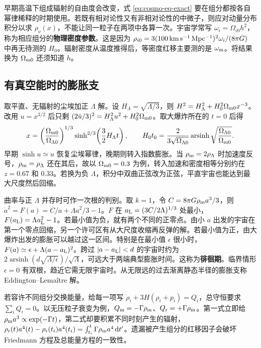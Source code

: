 早期高温下组成辐射的自由度会改变，式 \eqref{eq:cosmo-eq-exact} 要在组分都按各自幂律稀释的时期使用。若既有相对论性又有非相对论性的中微子，则应对动量分布积分以求 $\rho_\nu(x)$，不能让同一粒子在两项中各算一次。宇宙学常写 $\omega_i=\Omega_{i0}h^2$，称为相应组分的\textbf{物理密度参数}。这是因为 $\rho_{i0}=3(100\,{\rm km\,s^{-1}\,Mpc^{-1}})^2\omega_i/(8\pi G)$ 中再无待测的 $H_0$。辐射密度从温度推得后，等密度红移主要测的是 $\omega_{\rm m}$。将结果换为 $\Omega_{\rm m0}$ 还须知道 $h$。

\subsection{有真空能时的膨胀支}

取平直、无辐射的尘埃加正 $\Lambda$ 解。设 $H_\Lambda=\sqrt{\Lambda/3}$，则 $H^2=H_\Lambda^2+H_0^2\Omega_{\rm m0}x^{-3}$。改用 $u=x^{3/2}$ 后只剩 $(2\dot u/3)^2=H_\Lambda^2u^2+H_0^2\Omega_{\rm m0}$。取大爆炸所在的 $t=0$ 后得
\begin{equation}\label{eq:cosmo-lambda-age}
 x=\left(\frac{\Omega_{\rm m0}}{\Omega_{\Lambda0}}\right)^{1/3}
      \sinh^{2/3}\!\left(\frac32H_\Lambda t\right),\qquad
 H_0t_0=\frac{2}{3\sqrt{\Omega_{\Lambda0}}}
     \operatorname{arsinh}\sqrt{\frac{\Omega_{\Lambda0}}{\Omega_{\rm m0}}}.
\end{equation}
早期 $\sinh u\simeq u$ 恢复尘埃幂律，晚期则转入指数膨胀。当 $\rho_{\rm m}=2\rho_\Lambda$ 时加速度反号，$\rho_{\rm m}=\rho_\Lambda$ 还在其后，故以 $\Omega_{\rm m0}=0.3$ 为例，转入加速和密度相等分别约在 $z=0.67$ 和 $0.33$。若换为负 $\Lambda$，积分中双曲正弦改为正弦，平直宇宙也能达到最大尺度然后回缩。

曲率与正 $\Lambda$ 并存时可作一次根的判别。取 $k=1$，令 $C=8\pi G\rho_{\rm m}a^3/3$，则 $\dot a^2=F(a)=C/a+\Lambda a^2/3-1$。$F$ 在 $a_{\rm L}=(3C/2\Lambda)^{1/3}$ 处最小，$F(a_{\rm L})=\Lambda a_{\rm L}^2-1$。若最小值为负，就有两个不同的正零点。由小 $a$ 出发的宇宙在第一个零点回缩，另一个许可区有从大尺度收缩再反弹的解。若最小值为正，由大爆炸出发的膨胀可以越过这一区间。特别是在最小值 $\epsilon$ 很小时，$F(a)\simeq\epsilon+\Lambda(a-a_{\rm L})^2$。跨过 $|a-a_{\rm L}|<d$ 的宇宙时约为 $2\operatorname{arsinh}(d\sqrt{\Lambda/\epsilon})/\sqrt\Lambda$，可远大于两端典型膨胀时间。这称为\textbf{徘徊期}。临界情形 $\epsilon=0$ 有双根，趋近它需无限宇宙时。从无限远的过去渐离静态半径的膨胀支称 Eddington--Lemaître 解。

若容许不同组分交换能量，给每一项写 $\dot\rho_i+3H(\rho_i+p_i)=Q_i$，总守恒要求 $\sum_i Q_i=0$。以无压粒子衰变为例，$Q_{\rm m}=-\Gamma\rho_{\rm m}$、$Q_{\rm r}=+\Gamma\rho_{\rm m}$。第一式立即给 $\rho_{\rm m}a^3\propto \exp(-\Gamma t)$，第二式却要积累不同时刻产生的辐射，$\rho_{\rm r}(t)a^4(t)-\rho_{\rm r}(t_i)a^4(t_i)=\int_{t_i}^t\Gamma\rho_{\rm m}a^4\,\dd t'$。遗漏被产生组分的红移因子会破坏 Friedmann 方程及总能量方程的一致性。


